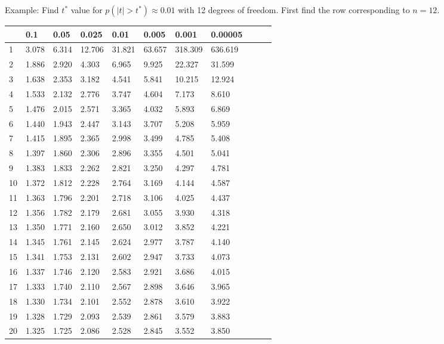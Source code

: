 \begin{frame}{\small Example: Find $t^*$ value for $p(|t|>t^*)
\approx 0.01$ with 12 degrees of freedom.}
{\tiny First find the row corresponding to $n=12$.}

  {
\fontsize{5pt}{5pt}
\selectfont

\begin{tabular}{l|llllllllll}
 & 0.1&0.05&0.025&0.01&0.005&0.001&0.00005\\ \hline
 1 & 3.078 & 6.314 & 12.706 & 31.821 & 63.657 & 318.309 & 636.619 \\ 
 2 & 1.886 & 2.920 & 4.303 & 6.965 & 9.925 & 22.327 & 31.599 \\ 
 3 & 1.638 & 2.353 & 3.182 & 4.541 & 5.841 & 10.215 & 12.924 \\ 
 4 & 1.533 & 2.132 & 2.776 & 3.747 & 4.604 & 7.173 & 8.610 \\ 
 5 & 1.476 & 2.015 & 2.571 & 3.365 & 4.032 & 5.893 & 6.869 \\ 
[5pt]
 6 & 1.440 & 1.943 & 2.447 & 3.143 & 3.707 & 5.208 & 5.959 \\ 
 7 & 1.415 & 1.895 & 2.365 & 2.998 & 3.499 & 4.785 & 5.408 \\ 
 8 & 1.397 & 1.860 & 2.306 & 2.896 & 3.355 & 4.501 & 5.041 \\ 
 9 & 1.383 & 1.833 & 2.262 & 2.821 & 3.250 & 4.297 & 4.781 \\ 
10 & 1.372 & 1.812 & 2.228 & 2.764 & 3.169 & 4.144 & 4.587 \\ 
[5pt]
11 & 1.363 & 1.796 & 2.201 & 2.718 & 3.106 & 4.025 & 4.437 \\ 
\rowcolor{red}12 & 1.356 & 1.782 & 2.179 & 2.681 & 3.055 & 3.930 & 4.318 \\ 
13 & 1.350 & 1.771 & 2.160 & 2.650 & 3.012 & 3.852 & 4.221 \\ 
14 & 1.345 & 1.761 & 2.145 & 2.624 & 2.977 & 3.787 & 4.140 \\ 
15 & 1.341 & 1.753 & 2.131 & 2.602 & 2.947 & 3.733 & 4.073 \\ 
[5pt]
16 & 1.337 & 1.746 & 2.120 & 2.583 & 2.921 & 3.686 & 4.015 \\ 
17 & 1.333 & 1.740 & 2.110 & 2.567 & 2.898 & 3.646 & 3.965 \\ 
18 & 1.330 & 1.734 & 2.101 & 2.552 & 2.878 & 3.610 & 3.922 \\ 
19 & 1.328 & 1.729 & 2.093 & 2.539 & 2.861 & 3.579 & 3.883 \\ 
20 & 1.325 & 1.725 & 2.086 & 2.528 & 2.845 & 3.552 & 3.850 \\ 

\end{tabular}}
\end{frame}

